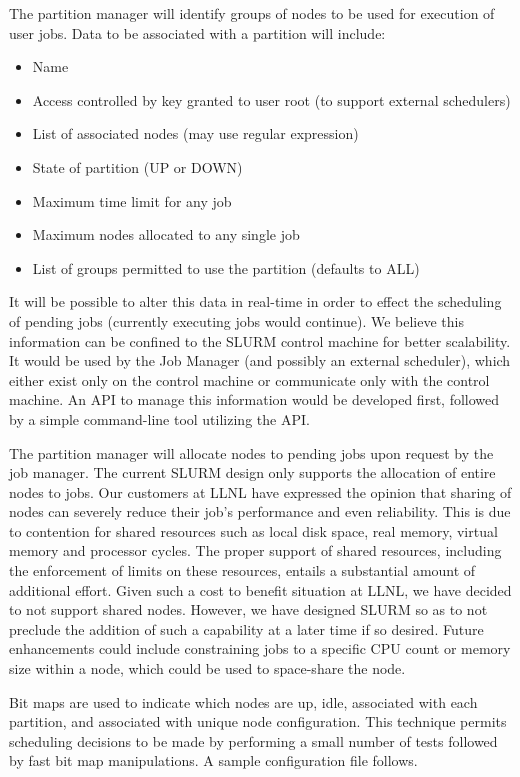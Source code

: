 The partition manager will identify groups of nodes to be used for
execution of user jobs. Data to be associated with a partition will include:
\begin{itemize}
\item Name
\item Access controlled by key granted to user root (to support external schedulers)
\item List of associated nodes (may use regular expression)
\item State of partition (UP or DOWN)
\item Maximum time limit for any job
\item Maximum nodes allocated to any single job
\item List of groups permitted to use the partition (defaults to ALL)
\end{itemize}

It will be possible to alter this data in real-time in order to effect the
scheduling of pending jobs (currently executing jobs would continue). 
We believe this information can be
confined to the SLURM control machine for better scalability. It would be used
by the Job Manager (and possibly an external scheduler), which either exist only 
on the control machine or communicate only with the control machine. An API to 
manage this information would be developed first, followed by a simple command-line 
tool utilizing the API.

The partition manager will allocate nodes to pending jobs upon request by 
the job manager. 
The current SLURM design only supports the allocation of entire nodes to 
jobs. Our customers at LLNL have expressed the opinion that sharing of 
nodes can severely reduce their job's performance and even reliability. 
This is due to contention for shared resources such as local disk space, 
real memory, virtual memory and processor cycles. The proper support of 
shared resources, including the enforcement of limits on these resources, 
entails a substantial amount of additional effort. Given such a cost to 
benefit situation at LLNL, we have decided to not support shared nodes. 
However, we have designed SLURM so as to not preclude the addition of 
such a capability at a later time if so desired.
Future enhancements could include constraining jobs to a specific CPU count 
or memory size within a node, which could be used to space-share the node.

Bit maps are used to indicate which nodes are up, idle, associated with 
each partition, and associated with unique node configuration. 
This technique permits scheduling decisions to be made by performing a 
small number of tests followed by fast bit map manipulations. 
A sample configuration file follows.

